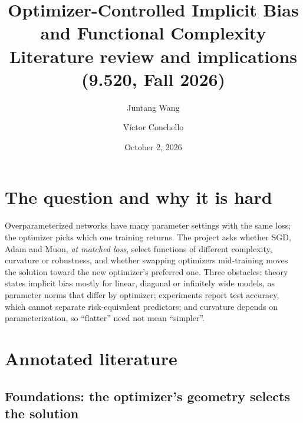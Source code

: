 \documentclass[10pt]{article}
\title{\vspace{-1.6em}Optimizer-Controlled Implicit Bias and Functional Complexity\\[2pt]
\large Literature review and implications (9.520, Fall 2026)}
\author{Juntang Wang \and V\'ictor Conchello}
\date{October 2, 2026}
\begin{document}
\maketitle
\vspace{-1.5em}

\section{The question and why it is hard}
\label{sec:question}

Overparameterized networks have many parameter settings with the same loss; the optimizer picks
which one training returns. The project asks whether SGD, Adam and Muon, \emph{at matched loss},
select functions of different complexity, curvature or robustness, and whether swapping optimizers
mid-training moves the solution toward the new optimizer's preferred one. Three obstacles: theory
states implicit bias mostly for linear, diagonal or infinitely wide models, as parameter norms that
differ by optimizer; experiments report test accuracy, which cannot separate risk-equivalent
predictors; and curvature depends on parameterization, so ``flatter'' need not mean ``simpler''.

\section{Annotated literature}
\label{sec:lit}

\subsection{Foundations: the optimizer's geometry selects the solution}
\label{sec:lit-foundations}


\end{document}
